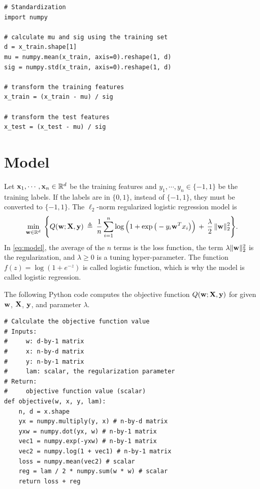\documentclass[11pt]{article}
\numberwithin{equation}{section}
\def\w{{\bf w}}
\def\X{{\bf X}}
\def\x{{\bf x}}
\def\y{{\bf y}}
\def\RB{{\mathbb R}}
\begin{document}
\vspace{3mm}
\begin{lstlisting}
# Standardization
import numpy

# calculate mu and sig using the training set
d = x_train.shape[1]
mu = numpy.mean(x_train, axis=0).reshape(1, d)
sig = numpy.std(x_train, axis=0).reshape(1, d)

# transform the training features
x_train = (x_train - mu) / sig

# transform the test features
x_test = (x_test - mu) / sig
\end{lstlisting}
\vspace{3mm}




\section{Model}

Let $\x_1, \cdots , \x_n \in \RB^d$ be the training features and $y_1 , \cdots , y_n \in \{-1, 1\}$ be the training labels.
If the labels are in $\{0, 1\}$, instead of $\{-1, 1\}$, they must be converted to $\{-1, 1\}$.
The $\ell_2$-norm regularized logistic regression model is
\begin{equation} \label{eq:model}
\min_{\w \in \RB^d} \;
\Bigg\{  
Q (\w ; \X , \y ) \: \triangleq \:
\frac{1}{n}  \sum_{i=1}^n \log \Big( 1 + \exp \big( - y_i \w^T x_i \big) \Big) 
\, + \, \frac{\lambda}{2} \, \| \w \|_2^2 \Bigg\} .
\end{equation}
In \eqref{eq:model}, the average of the $n$ terms is the loss function, 
the term  $ \lambda \| \w \|_2^2$ is the regularization,
and $\lambda \geq 0$ is a tuning hyper-parameter.
The function $f(z) = \log (1 + e^{-z})$ is called logistic function, which is why the model is called logistic regression.


The following Python code computes the objective function $Q (\w ; \X , \y )$ for given $\w$, $\X$, $\y$, and parameter $\lambda$.


\vspace{3mm}
\begin{lstlisting}
# Calculate the objective function value
# Inputs:
#     w: d-by-1 matrix
#     x: n-by-d matrix
#     y: n-by-1 matrix
#     lam: scalar, the regularization parameter
# Return:
#     objective function value (scalar)
def objective(w, x, y, lam):
	n, d = x.shape
	yx = numpy.multiply(y, x) # n-by-d matrix
	yxw = numpy.dot(yx, w) # n-by-1 matrix
	vec1 = numpy.exp(-yxw) # n-by-1 matrix
	vec2 = numpy.log(1 + vec1) # n-by-1 matrix
	loss = numpy.mean(vec2) # scalar
	reg = lam / 2 * numpy.sum(w * w) # scalar
	return loss + reg
\end{lstlisting}
\vspace{3mm}
\end{document}
